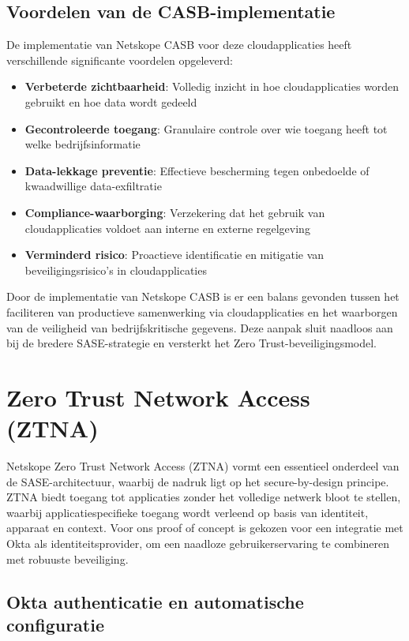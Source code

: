 \subsection{Voordelen van de CASB-implementatie}

De implementatie van Netskope CASB voor deze cloudapplicaties heeft verschillende significante voordelen opgeleverd:

\begin{itemize}
    \item \textbf{Verbeterde zichtbaarheid}: Volledig inzicht in hoe cloudapplicaties worden gebruikt en hoe data wordt gedeeld
    \item \textbf{Gecontroleerde toegang}: Granulaire controle over wie toegang heeft tot welke bedrijfsinformatie
    \item \textbf{Data-lekkage preventie}: Effectieve bescherming tegen onbedoelde of kwaadwillige data-exfiltratie
    \item \textbf{Compliance-waarborging}: Verzekering dat het gebruik van cloudapplicaties voldoet aan interne en externe regelgeving
    \item \textbf{Verminderd risico}: Proactieve identificatie en mitigatie van beveiligingsrisico's in cloudapplicaties
\end{itemize}

Door de implementatie van Netskope CASB is er een balans gevonden tussen het faciliteren van productieve samenwerking via cloudapplicaties en het waarborgen van de veiligheid van bedrijfskritische gegevens. Deze aanpak sluit naadloos aan bij de bredere SASE-strategie en versterkt het Zero Trust-beveiligingsmodel.

\section{Zero Trust Network Access (ZTNA)}
Netskope Zero Trust Network Access (ZTNA) vormt een essentieel onderdeel van de SASE-architectuur, waarbij de nadruk ligt op het secure-by-design principe. ZTNA biedt toegang tot applicaties zonder het volledige netwerk bloot te stellen, waarbij applicatiespecifieke toegang wordt verleend op basis van identiteit, apparaat en context. Voor ons proof of concept is gekozen voor een integratie met Okta als identiteitsprovider, om een naadloze gebruikerservaring te combineren met robuuste beveiliging.

\subsection{Okta authenticatie en automatische configuratie}


